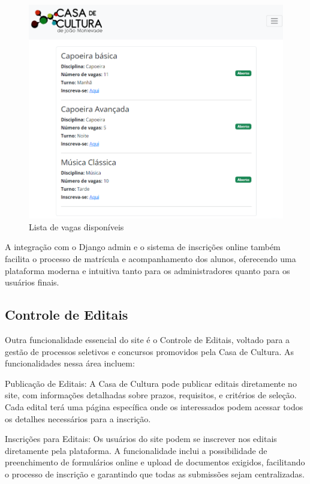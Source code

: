 \begin{figure}[htb]
	\caption{\label{fig_grafico}Lista de vagas disponíveis}
	\begin{center}
	    \includegraphics[scale=0.25]{./img/lista_turmas.png}
	\end{center}
\end{figure}

A integração com o Django admin e o sistema de inscrições online também facilita o processo de matrícula e acompanhamento dos alunos, oferecendo uma plataforma moderna e intuitiva tanto para os administradores quanto para os usuários finais.

\subsection{Controle de Editais}

Outra funcionalidade essencial do site é o Controle de Editais, voltado para a gestão de processos seletivos e concursos promovidos pela Casa de Cultura. As funcionalidades nessa área incluem:

Publicação de Editais: A Casa de Cultura pode publicar editais diretamente no site, com informações detalhadas sobre prazos, requisitos, e critérios de seleção. Cada edital terá uma página específica onde os interessados podem acessar todos os detalhes necessários para a inscrição.

Inscrições para Editais: Os usuários do site podem se inscrever nos editais diretamente pela plataforma. A funcionalidade inclui a possibilidade de preenchimento de formulários online e upload de documentos exigidos, facilitando o processo de inscrição e garantindo que todas as submissões sejam centralizadas.

